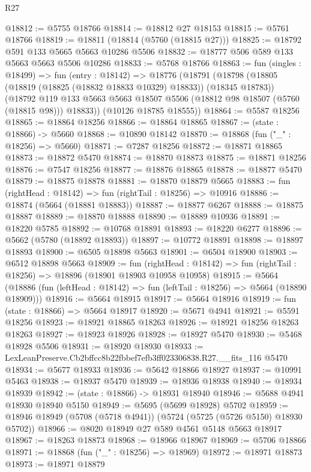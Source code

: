 \begin{lexlean}{R27}
\begin{coremodule}
@18812 := @5755 @18766
@18814 := @18812 @27 @18153
@18815 := @5761 @18766
@18819 := @18811 (@18814 (@5760 (@18815 @27)))
@18825 := @18792 @591 @133 @5665 @5663 @10286 @5506
@18832 := @18777 @506 @589 @133 @5663 @5663 @5506 @10286
@18833 := @5768 @18766
@18863 := fun (singles : @18499) =>
  fun (entry : @18142) =>
  @18776
    (@18791
      (@18798
        (@18805 (@18819 (@18825 (@18832 @18833 @10329) @18833)) (@18345 @18783))
        (@18792 @119 @133 @5663 @5663 @18507 @5506 (@18812 @98 @18507 (@5760 (@18815 @98))) @18833))
      (@10126 @18785 @18555))
@18864 := @5587 @18256
@18865 := @18864 @18256
@18866 := @18864 @18865
@18867 := (state : @18866) -> @5660
@18868 := @10890 @18142
@18870 := @18868 (fun ("_" : @18256) => @5660)
@18871 := @7287 @18256
@18872 := @18871 @18865
@18873 := @18872 @5470
@18874 := @18870 @18873
@18875 := @18871 @18256
@18876 := @7547 @18256
@18877 := @18876 @18865
@18878 := @18877 @5470
@18879 := @18875 @18878
@18881 := @18870 @18879 @5665
@18883 := fun (rightHead : @18142) => fun (rightTail : @18256) => @10916
@18886 := @18874 (@5664 (@18881 @18883))
@18887 := @18877 @6267
@18888 := @18875 @18887
@18889 := @18870 @18888
@18890 := @18889 @10936
@18891 := @18220 @5785
@18892 := @10768 @18891
@18893 := @18220 @6277
@18896 := @5662 (@5780 (@18892 @18893))
@18897 := @10772 @18891
@18898 := @18897 @18893
@18900 := @6505 @18898 @5663
@18901 := @6504 @18900
@18903 := @6512 @18898 @5663
@18909 := fun (rightHead : @18142) =>
  fun (rightTail : @18256) => @18896 (@18901 @18903 @10958 @10958)
@18915 := @5664
    (@18886 (fun (leftHead : @18142) => fun (leftTail : @18256) => @5664 (@18890 @18909)))
@18916 := @5664 @18915
@18917 := @5664 @18916
@18919 := fun (state : @18866) => @5664 @18917
@18920 := @5671 @4941
@18921 := @5591 @18256
@18923 := @18921 @18865 @18263
@18926 := @18921 @18256 @18263 @18263
@18927 := @18923 @18926
@18928 := @18927 @5470
@18930 := @5468 @18928 @5506
@18931 := @18920 @18930
@18933 := LexLeanPreserve.Cb2bffcc8b22fbbef7efb3ff023306838.R27.__fits_116 @5470
@18934 := @5677 @18933
@18936 := @5642 @18866 @18927
@18937 := @10991 @5463
@18938 := @18937 @5470
@18939 := @18936 @18938
@18940 := @18934 @18939
@18942 := (state : @18866) -> @18931 @18940
@18946 := @5688 @4941 @18930 @18940 @5150
@18949 := @5695 (@5699 @18928) @5702
@18959 := @18946 @18949 (@5708 (@5718 @4941)) (@5724 (@5725 (@5726 @5150) @18930 @5702))
@18966 := @8020 @18949 @27 @589 @4561 @5148 @5663 @18917
@18967 := @18263 @18873
@18968 := @18966 @18967
@18969 := @5706 @18866
@18971 := @18868 (fun ("_" : @18256) => @18969)
@18972 := @18971 @18873
@18973 := @18971 @18879

\end{coremodule}
\end{lexlean}
